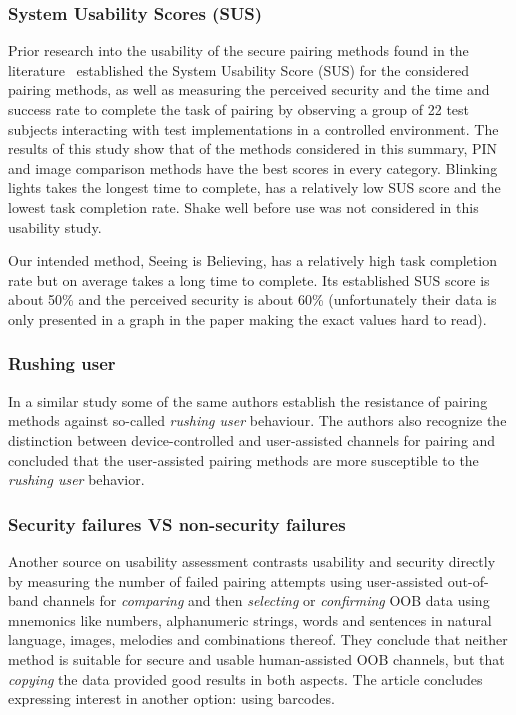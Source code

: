 \documentclass[conference, 11pt]{sty/IEEEtran}
\begin{document}
\subsubsection{System Usability Scores (SUS)}
Prior research into the usability of the secure pairing methods found in the literature~\cite{kumar2009comparative} established the System Usability Score (SUS) for the considered pairing methods, as well as measuring the perceived security and the time and success rate to complete the task of pairing by observing a group of 22 test subjects interacting with test implementations in a controlled environment.
The results of this study show that of the methods considered in this summary, PIN and image comparison methods have the best scores in every category.
Blinking lights takes the longest time to complete, has a relatively low SUS score and the lowest task completion rate.
Shake well before use was not considered in this usability study.

Our intended method, Seeing is Believing, has a relatively high task completion rate but on average takes a long time to complete.
Its established SUS score is about 50\% and the perceived security is about 60\% (unfortunately their data is only presented in a graph in the paper making the exact values hard to read).

\subsubsection{Rushing user}
In a similar study \cite{kobsa2009serial} some of the same authors establish the resistance of pairing methods against so-called \textit{rushing user} behaviour.
The authors also recognize the distinction between device-controlled and user-assisted channels for pairing and concluded that the user-assisted pairing methods are more susceptible to the \textit{rushing user} behavior.

\subsubsection{Security failures VS non-security failures}
Another source on usability assessment contrasts usability and security directly~\cite{kainda2009usability} by measuring the number of failed pairing attempts using user-assisted out-of-band channels for \textit{comparing} and then \textit{selecting} or \textit{confirming} OOB data using mnemonics like numbers, alphanumeric strings, words and sentences in natural language, images, melodies and combinations thereof.
They conclude that neither method is suitable for secure and usable human-assisted OOB channels, but that \textit{copying} the data provided good results in both aspects.
The article concludes expressing interest in another option: using barcodes.
\end{document}

